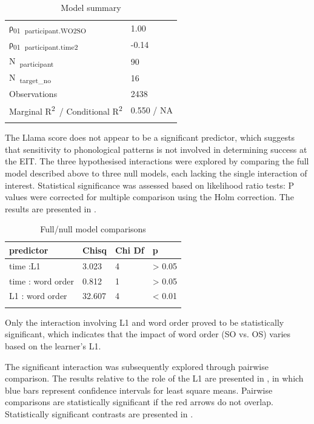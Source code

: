 \begin{table}
\begin{tabularx}{\textwidth}{XXXX}
    ρ\textsubscript{01}~\textsubscript{participant.WO2SO} & \multicolumn{3}{X}{1.00}\\
    ρ\textsubscript{01}~\textsubscript{participant.time2} & \multicolumn{3}{X}{{}-0.14}\\
    N~\textsubscript{participant} & \multicolumn{3}{X}{90}\\
    N~\textsubscript{target\_no} & \multicolumn{3}{X}{16}\\
    \midrule
    Observations & \multicolumn{3}{X}{2438}\\
    Marginal R\textsuperscript{2}~/ Conditional R\textsuperscript{2} & \multicolumn{3}{X}{0.550 / NA}\\
    \lspbottomrule
    \end{tabularx}
    \caption{Model summary}
    \label{tab:04:3}
\end{table}

The Llama score does not appear to be a significant predictor, which suggests that sensitivity to phonological patterns is not involved in determining success at the EIT. The three hypothesised interactions were explored by comparing the full model described above to three null models, each lacking the single interaction of interest. Statistical significance was assessed based on likelihood ratio tests: P values were corrected for multiple comparison using the Holm correction. The results are presented in .

\begin{table}
    \begin{tabularx}{\textwidth}{XXXX}
    \lsptoprule
    predictor & Chisq & Chi Df & p\\
    \midrule
    time :L1 & 3.023 & 4 & > 0.05\\
    time : word order & 0.812 & 1 & > 0.05\\
    L1 : word order & 32.607 & 4 & < 0.01\\
    \lspbottomrule
    \end{tabularx}
    \caption{Full/null model comparisons}
    \label{tab:04:4}
\end{table}

Only the interaction involving L1 and word order proved to be statistically significant, which indicates that the impact of word order (SO vs. OS) varies based on the learner’s L1. 

The significant interaction was subsequently explored through pairwise comparison. The results relative to the role of the L1 are presented in , in which blue bars represent confidence intervals for least square means. Pairwise comparisons are statistically significant if the red arrows do not overlap. Statistically significant contrasts are presented in .

